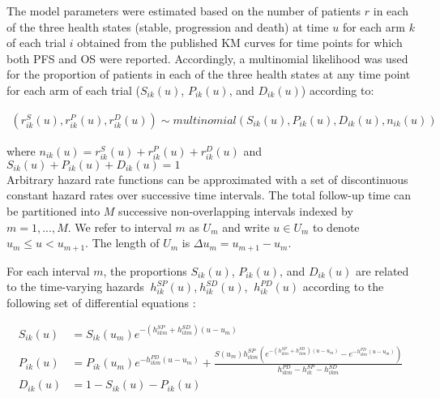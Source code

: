 \documentclass[11pt,final,fleqn]{article}\usepackage[]{graphicx}\usepackage[]{color}
\theoremstyle{plain}
\newcounter{subsubsubsection}[subsubsection]
\begin{document}
{
The model parameters were estimated based on the number of patients $r$ in each of the three health states (stable, progression and death) at time $u$ for each arm $k$ of each trial $i$ obtained from the published KM curves for time points for which both PFS and OS were reported. Accordingly, a multinomial likelihood was used for the proportion of patients in each of the three health states at any time point for each arm of each trial ($S_{ik}(u)$, $P_{ik}(u)$, and $D_{ik}(u)$) according to: 

\begin{equation} \label{eqn:multinomial_likelihood}
\begin{aligned}
(r_{ik}^{S}(u),r_{ik}^{P}(u),r_{ik}^{D}(u)) \sim multinomial(S_{ik}(u),P_{ik}(u),D_{ik}(u),n_{ik}(u))
\end{aligned}
\end{equation}

where $n_{ik}(u)=r_{ik}^{S}(u)+r_{ik}^{P}(u)+r_{ik}^{D}(u)$ and $S_{ik}(u)+P_{ik}(u)+D_{ik}(u)=1$
\\

Arbitrary hazard rate functions can be approximated with a set of discontinuous constant hazard rates over successive time intervals. The total follow-up time can be partitioned into $M$ successive non-overlapping intervals indexed by $m= 1, ..., M$. We refer to interval $m$ as $U_{m}$ and write $u \in U_{m}$ to denote $u_{m}\leq u<  u_{m+1}$. The length of $U_{m}$ is $\Delta u_{m} =u_{m+1}-u_{m}$. 

For each interval $m$, the proportions  $S_{ik}(u)$, $P_{ik}(u)$, and $D_{ik}(u)$ are related to the time-varying hazards $\ h_{ik}^{SP} (u) $,$\ h_{ik}^{SD} (u) $, $\ h_{ik}^{PD} (u)$ according to the following set of differential equations \citep{jansen2013multivariate}: 

\begin{equation} \label{eqn:diff_equations}
\begin{aligned}
S_{ik}(u) &= S_{ik}(u_{m}) e^{-(h_{ikm}^{SP}+h_{ikm}^{SD})(u-u_{m})} \\
P_{ik}(u) &= P_{ik}(u_{m}) e^{-h_{ikm}^{PD}(u-u_{m})}+\frac{S(u_{m})h_{ikm}^{SP}(e^{-(h_{ikm}^{SP}+h_{ikm}^{SD})(u-u_{m})}-e^{-h_{ikm}^{PD}(u-u_{m})})}{h_{ikm}^{PD}-h_{ik}^{SP}-h_{ikm}^{SD}} \\
D_{ik}(u) &= 1-S_{ik}(u) - P_{ik}(u) \\
\end{aligned}
\end{equation}
\\

}
\end{document}
